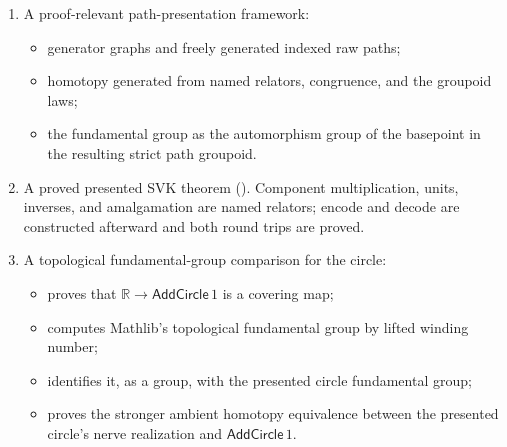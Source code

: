 \documentclass{lmcs}
\theoremstyle{definition}
\theoremstyle{plain}
\theoremstyle{remark}
\begin{document}
\begin{enumerate}
    \item A proof-relevant path-presentation framework:
    \begin{itemize}
        \item generator graphs and freely generated indexed raw paths;
        \item homotopy generated from named relators, congruence, and the
        groupoid laws;
        \item the fundamental group as the automorphism group of the basepoint
        in the resulting strict path groupoid.
    \end{itemize}

    \item A proved presented SVK theorem
    ().  Component multiplication, units,
    inverses, and amalgamation are named relators; encode and decode are
    constructed afterward and both round trips are proved.

    \item A topological fundamental-group comparison for the circle:
    \begin{itemize}
        \item {} proves that
        \(\mathbb R\to\mathsf{AddCircle}\,1\) is a covering map;
        \item {} computes Mathlib's topological
        fundamental group by lifted winding number;
        \item {} identifies it,
        as a group, with the presented circle fundamental group;
        \item {} proves
        the stronger ambient homotopy equivalence between the presented circle's
        nerve realization and \(\mathsf{AddCircle}\,1\).
    \end{itemize}


\end{enumerate}
\end{document}
